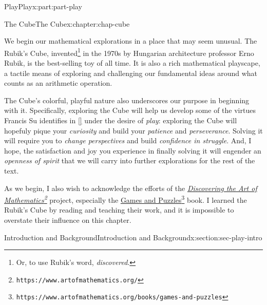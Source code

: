 \documentclass[oneside,10pt,]{book}
\newcommand{\xreffont}{\relax}
\numberwithin{equation}{section}
\begin{document}
\begin{partptx}{Play}{}{Play}{}{}{x:part:part-play}
%
\typeout{************************************************}
\typeout{************************************************}
%
\begin{chapterptx}{The Cube}{}{The Cube}{}{}{x:chapter:chap-cube}
\begin{introduction}{}%
We begin our mathematical explorations in a place that may seem unusual. The Rubik's Cube, invented\footnote{Or, to use Rubik's word, \emph{discovered}.\label{g:fn:idp105544711912208}} in the 1970s by Hungarian architecture professor Erno Rubik, is the best-selling toy of all time. It is also a rich mathematical playscape, a tactile means of exploring and challenging our fundamental ideas around what counts as an arithmetic operation.%
\par
The Cube's colorful, playful nature also underscores our purpose in beginning with it. Specifically, exploring the Cube will help us develop some of the virtues Francis Su identifies in \hyperlink{x:biblio:Su2020}{[{\xreffont 1}]} under the desire of \emph{play}: exploring the Cube will hopefuly pique your \emph{curiosity} and build your \emph{patience} and \emph{perseverance}. Solving it will require you to \emph{change perspectives} and build \emph{confidence in struggle}. And, I hope, the satisfaction and joy you experience in finally solving it will engender an \emph{openness of spirit} that we will carry into further explorations for the rest of the text.%
\par
As we begin, I also wish to acknowledge the efforts of the \emph{\href{https://www.artofmathematics.org/}{Discovering the Art of Mathematics}\footnote{\nolinkurl{https://www.artofmathematics.org/}\label{g:fn:idp105544711917072}}} project, especially the \href{https://www.artofmathematics.org/books/games-and-puzzles}{Games and Puzzles}\footnote{\nolinkurl{https://www.artofmathematics.org/books/games-and-puzzles}\label{g:fn:idp105544711917840}} book. I learned the Rubik's Cube by reading and teaching their work, and it is impossible to overstate their influence on this chapter.%
\end{introduction}%
%
%
\typeout{************************************************}
\typeout{************************************************}
%
\begin{sectionptx}{Introduction and Background}{}{Introduction and Background}{}{}{x:section:sec-play-intro}
\begin{introduction}{}%

\end{introduction}
\end{sectionptx}
\end{chapterptx}
\end{partptx}
\end{document}
